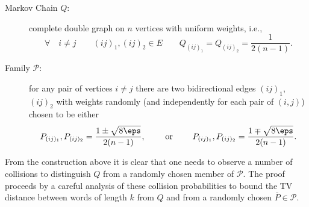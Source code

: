 \begin{description}
	\item[Markov Chain $Q$:] complete double graph on $n$ vertices with uniform weights, i.e., 
	\[
	\forall \quad i\neq j \quad\quad (ij)_1, (ij)_2\in E  \quad\quad  Q_{(ij)_1}=Q_{(ij)_2}=\frac{1}{2(n-1)}.
	\]
	\item[Family $\mathcal{P}$:] for any pair of vertices $i\neq j$ there are two bidirectional edges $(ij)_1$, $(ij)_2$
	with weights randomly (and independently for each pair of $(i,j)$) chosen to be either
	\[
	P_{(ij)_1}, P_{(ij)_2}=\frac{1\pm \sqrt{8\eps}}{2(n-1)},
	\quad\quad\text{ or }\quad\quad
	P_{(ij)_1},P_{(ij)_2}=\frac{1\mp \sqrt{8\eps}}{2(n-1)}.
	\]
\end{description}
From the construction above it is clear that one needs to observe a number of collisions to distinguish $Q$ from a randomly chosen member of $\mathcal{P}$. The proof proceeds by a careful analysis of these collision probabilities to bound the TV distance between words of length $k$ from $Q$ and from a randomly chosen $\bar{P} \in \mathcal{P}$.
